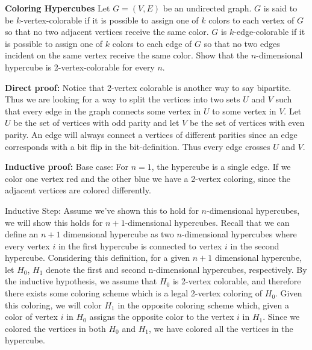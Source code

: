 \question \textbf{Coloring Hypercubes} \newline Let $G = (V, E)$ be 
an undirected graph. $G$ is said to be $k$-vertex-colorable if it is 
possible to assign one of $k$ colors to each vertex of $G$ so that no 
two adjacent vertices receive the same color. $G$ is $k$-edge-colorable 
if it is possible to assign one of $k$ colors to each edge of $G$ so 
that no two edges incident on the same vertex receive the same color. \newline
Show that the $n$-dimensional hypercube is 2-vertex-colorable for 
every $n$.
\begin{solution}[1in] 

\textbf{Direct proof:}
Notice that 2-vertex colorable is another way to say bipartite. Thus we are looking for a way to split the vertices into two sets $U$ and $V$ such that every edge in the graph connects some vertex in $U$ to some vertex in $V$. Let $U$ be the set of vertices with odd parity and let $V$ be the set of vertices with even parity. An edge will always connect a vertices of different parities since an edge corresponds with a bit flip in the bit-definition. Thus every edge crosses $U$ and $V$.\newline

\textbf{Inductive proof:}
Base case: For $n = 1$, the hypercube is a single edge. If we color 
one vertex red and the other blue we have a 2-vertex coloring, since 
the adjacent vertices are colored differently. 

Inductive Step: Assume we’ve shown this to hold for $n$-dimensional 
hypercubes, we will show this holds for $n + 1$-dimensional hypercubes. 
Recall that we can define an $n + 1$ dimensional hypercube as two 
$n$-dimensional hypercubes where every vertex $i$ in the first 
hypercube is connected to vertex $i$ in the second hypercube. 
Considering this definition, for a given $n + 1$ dimensional 
hypercube, let $H_0$, $H_1$ denote the first and second n-dimensional 
hypercubes, respectively. By the inductive hypothesis, we assume that 
$H_0$ is 2-vertex colorable, and therefore there exists some coloring 
scheme which is a legal 2-vertex coloring of $H_0$. Given this coloring, 
we will color $H_1$ in the opposite coloring scheme which, given a color 
of vertex $ i$ in $H_0$ assigns the opposite color to the vertex $i$ in 
$H_1$. Since we colored the vertices in both $H_0$ and $H_1$, we have 
colored all the vertices in the hypercube. 


\end{solution}
